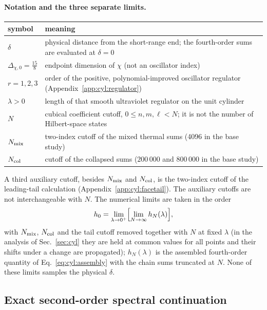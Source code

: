 \documentclass[11pt,a4paper]{article}
\numberwithin{equation}{section}
\begin{document}
\paragraph{Notation and the three separate limits.}
\begin{center}\small
\begin{tabular}{@{}l>{\raggedright\arraybackslash}p{}@{}}
\toprule
symbol & meaning\\
\midrule
$\delta$ & physical distance from the short-range end; the fourth-order sums are evaluated at $\delta=0$\\
$\Delta_{\chi,0}=\frac{15}{8}$ & endpoint dimension of $\chi$ (not an oscillator index)\\
$r=1,2,3$ & order of the positive, polynomial-improved oscillator regulator (Appendix~\ref{app:cyl:regulator})\\
$\lambda>0$ & length of that smooth ultraviolet regulator on the unit cylinder\\
$N$ & cubical coefficient cutoff, $0\le n,m,\ell<N$; it is not the number of Hilbert-space states\\
$N_{\rm mix}$ & two-index cutoff of the mixed thermal sums (4096 in the base study)\\
$N_{\rm col}$ & cutoff of the collapsed sums ($200\,000$ and $800\,000$ in the base study)\\
\bottomrule
\end{tabular}
\end{center}
A third auxiliary cutoff, besides $N_{\rm mix}$ and $N_{\rm col}$, is the two-index cutoff of the leading-tail calculation (Appendix~\ref{app:cyl:facetail}). The
auxiliary cutoffs are not interchangeable with $N$. The numerical limits are taken in the order
\begin{equation}
 h_0=\lim_{\lambda\to0^+}\Bigl[\lim_{N\to\infty}h_N(\lambda)\Bigr],
 \label{eq:cyl:limits}
\end{equation}
with $N_{\rm mix}$, $N_{\rm col}$ and the tail cutoff removed together with $N$ at fixed $\lambda$ (in the analysis of
Sec.~\ref{sec:cyl} they are held at common values for all points and their shifts under a change are propagated); $h_N(\lambda)$ is
the assembled fourth-order quantity of Eq.~\eqref{eq:cyl:assembly} with the chain sums truncated at $N$. None of these
limits samples the physical $\delta$.

\subsection{Exact second-order spectral continuation}\label{app:cyl:second}
\end{document}

